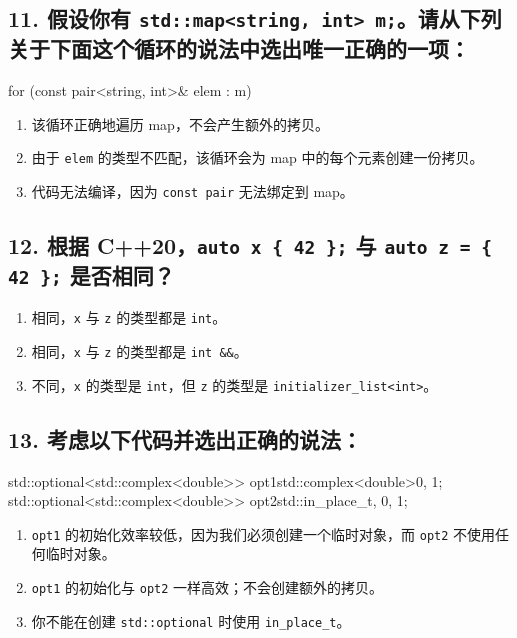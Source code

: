 \subsection{11. 假设你有 \texttt{std::map<string, int> m;}。请从下列关于下面这个循环的说法中选出唯一正确的一项：}

\begin{codebox}[cpp]
for (const pair<string, int>& elem : m)
\end{codebox}

\begin{enumerate}
\item 该循环正确地遍历 map，不会产生额外的拷贝。
\item 由于 \texttt{elem} 的类型不匹配，该循环会为 map 中的每个元素创建一份拷贝。
\item 代码无法编译，因为 \texttt{const pair} 无法绑定到 map。
\end{enumerate}

\subsection{12. 根据 C++20，\texttt{auto x \{ 42 \};} 与 \texttt{auto z = \{ 42 \};} 是否相同？}

\begin{enumerate}
\item 相同，\texttt{x} 与 \texttt{z} 的类型都是 \texttt{int}。
\item 相同，\texttt{x} 与 \texttt{z} 的类型都是 \texttt{int \&\&}。
\item 不同，\texttt{x} 的类型是 \texttt{int}，但 \texttt{z} 的类型是 \texttt{initializer\_list<int>}。
\end{enumerate}

\subsection{13. 考虑以下代码并选出正确的说法：}

\begin{codebox}[cpp]
std::optional<std::complex<double>> opt1{std::complex<double>{0, 1}};
std::optional<std::complex<double>> opt2{std::in_place_t, 0, 1};
\end{codebox}

\begin{enumerate}
\item \texttt{opt1} 的初始化效率较低，因为我们必须创建一个临时对象，而 \texttt{opt2} 不使用任何临时对象。
\item \texttt{opt1} 的初始化与 \texttt{opt2} 一样高效；不会创建额外的拷贝。
\item 你不能在创建 \texttt{std::optional} 时使用 \texttt{in\_place\_t}。
\end{enumerate}

